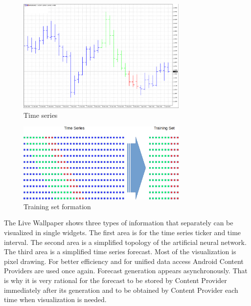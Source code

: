 \documentclass{ifacconf}
\begin{document}
\begin{figure}
\begin{center}
\includegraphics[width=8.4cm]{images/fig0006}
\caption{Time series} 
\label{fig0006}
\end{center}
\end{figure}

\begin{figure}
\begin{center}
\includegraphics[width=8.4cm]{images/fig0004}
\caption{Training set formation} 
\label{fig0004}
\end{center}
\end{figure}

The Live Wallpaper shows three types of information that separately can be visualized in single widgets. The first area is for the time series ticker and time interval. The second area is a simplified topology of the artificial neural network. The third area is a simplified time series forecast. Most of the visualization is pixel drawing. For better efficiency and for unified data access Android Content Providers are used once again. Forecast generation appears asynchronously. That is why it is very rational for the forecast to be stored by Content Provider immediately after its generation and to be obtained by Content Provider each time when visualization is needed. 
\end{document}
